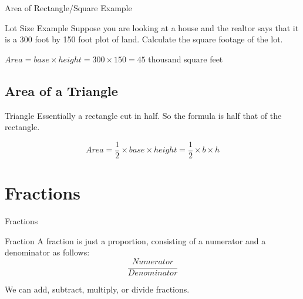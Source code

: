 \documentclass{beamer}
\begin{document}
\begin{frame}{Area of Rectangle/Square Example}
  
  \begin{exampleblock}{Lot Size Example}
    Suppose you are looking at a house and the realtor says that it is a 300 foot by 150 foot plot of land. Calculate the square footage of the lot.

$Area = base \times height = 300 \times 150 = 45$ thousand square feet

  \end{exampleblock}


\end{frame}


\subsection{Area of a Triangle}

\begin{frame}
 
  \begin{block}{Triangle}
  Essentially a rectangle cut in half. So the formula is half that of the rectangle.

  $$Area = \frac{1}{2} \times base \times height = \frac{1}{2} \times b \times h$$
  \end{block}


\end{frame}

\section{Fractions}

\begin{frame}{Fractions}

  \begin{block}{Fraction}
  A fraction is just a proportion, consisting of a numerator and a denominator as follows:
 $$\frac{Numerator}{Denominator}$$
  \end{block}

We can add, subtract, multiply, or divide fractions.

\end{frame}
\end{document}
